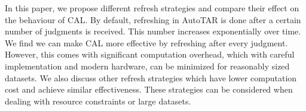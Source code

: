 In this paper, we propose different refresh strategies and compare their effect on
the behaviour of CAL. By default, refreshing in AutoTAR is done after a
certain number of judgments is
received. This number increases exponentially over time. We find
we can make CAL more effective by refreshing after every judgment.
However, this comes with significant computation overhead, which with careful
implementation and modern hardware, can be minimized for reasonably sized
datasets. We also discuss other refresh strategies which have lower computation
cost and achieve similar effectiveness. These strategies can be considered when
dealing with resource constraints or large datasets.
